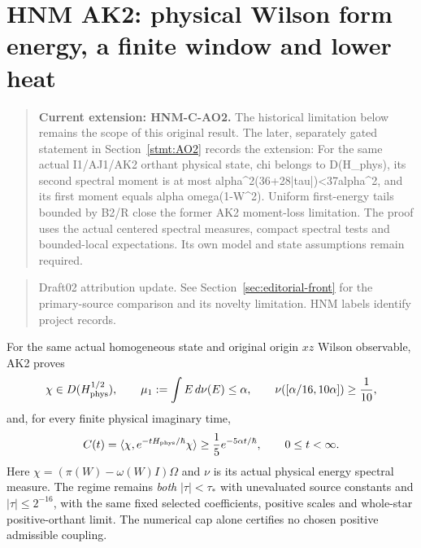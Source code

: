 \section{HNM AK2: physical Wilson form energy, a finite window and lower heat\workstar}
\begin{quote}\small\textbf{Current extension: HNM-C-AO2.} The historical limitation below remains the scope of this original result. The later, separately gated statement in Section~\ref{stmt:AO2} records the extension: For the same actual I1/AJ1/AK2 orthant physical state, chi belongs to D(H\_phys), its second spectral moment is at most alpha\textasciicircum{}2(36+28|tau|)<37alpha\textasciicircum{}2, and its first moment equals alpha omega(1-W\textasciicircum{}2). Uniform first-energy tails bounded by B2/R close the former AK2 moment-loss limitation. The proof uses the actual centered spectral measures, compact spectral tests and bounded-local expectations. Its own model and state assumptions remain required.\end{quote}
\begin{quote}\small Draft02 attribution update. See Section~\ref{sec:editorial-front} for the primary-source comparison and its novelty limitation. HNM labels identify project records.\end{quote}
\label{r28:sec:ak2}
For the same actual homogeneous state and original origin $xz$ Wilson observable, AK2 proves
\begin{equation}
 \chi\in D(H_{\rm phys}^{1/2}),\qquad
 \mu_1:=\int E\,d\nu(E)\le\alpha,\qquad
 \nu([\alpha/16,10\alpha])\ge\frac1{10},
 \label{r28:eq:ak2-targets}
\end{equation}
and, for every finite physical imaginary time,
\begin{equation}
 C(t)=\langle\chi,e^{-tH_{\rm phys}/\hbar}\chi\rangle
 \ge\frac15e^{-5\alpha t/\hbar},\qquad0\le t<\infty.
 \label{r28:eq:ak2-lower-heat}
\end{equation}
Here $\chi=(\pi(W)-\omega(W)I)\Omega$ and $\nu$ is its actual physical energy spectral measure. The regime remains \emph{both} $|\tau|<\tau_*$ with unevaluated source constants and $|\tau|\le2^{-16}$, with the same fixed selected coefficients, positive scales and whole-star positive-orthant limit. The numerical cap alone certifies no chosen positive admissible coupling.

